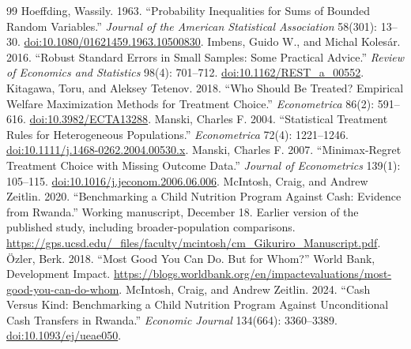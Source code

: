 \documentclass[11pt]{article}
\begin{document}
\begin{singlespace}
\begin{thebibliography}{99}
 Hoeffding, Wassily. 1963. ``Probability Inequalities for Sums of Bounded Random Variables.'' \emph{Journal of the American Statistical Association} 58(301): 13--30. \href{https://doi.org/10.1080/01621459.1963.10500830}{doi:10.1080/01621459.1963.10500830}.
 Imbens, Guido W., and Michal Koles\'ar. 2016. ``Robust Standard Errors in Small Samples: Some Practical Advice.'' \emph{Review of Economics and Statistics} 98(4): 701--712. \href{https://doi.org/10.1162/REST_a_00552}{doi:10.1162/REST\_a\_00552}.
 Kitagawa, Toru, and Aleksey Tetenov. 2018. ``Who Should Be Treated? Empirical Welfare Maximization Methods for Treatment Choice.'' \emph{Econometrica} 86(2): 591--616. \href{https://doi.org/10.3982/ECTA13288}{doi:10.3982/ECTA13288}.
 Manski, Charles F. 2004. ``Statistical Treatment Rules for Heterogeneous Populations.'' \emph{Econometrica} 72(4): 1221--1246. \href{https://doi.org/10.1111/j.1468-0262.2004.00530.x}{doi:10.1111/j.1468-0262.2004.00530.x}.
 Manski, Charles F. 2007. ``Minimax-Regret Treatment Choice with Missing Outcome Data.'' \emph{Journal of Econometrics} 139(1): 105--115. \href{https://doi.org/10.1016/j.jeconom.2006.06.006}{doi:10.1016/j.jeconom.2006.06.006}.
 McIntosh, Craig, and Andrew Zeitlin. 2020. ``Benchmarking a Child Nutrition Program Against Cash: Evidence from Rwanda.'' Working manuscript, December 18. Earlier version of the published study, including broader-population comparisons. \url{https://gps.ucsd.edu/_files/faculty/mcintosh/cm_Gikuriro_Manuscript.pdf}.
 \"Ozler, Berk. 2018. ``Most Good You Can Do. But for Whom?'' World Bank, Development Impact. \url{https://blogs.worldbank.org/en/impactevaluations/most-good-you-can-do-whom}.
 McIntosh, Craig, and Andrew Zeitlin. 2024. ``Cash Versus Kind: Benchmarking a Child Nutrition Program Against Unconditional Cash Transfers in Rwanda.'' \emph{Economic Journal} 134(664): 3360--3389. \href{https://doi.org/10.1093/ej/ueae050}{doi:10.1093/ej/ueae050}.


\end{thebibliography}
\end{singlespace}
\end{document}
